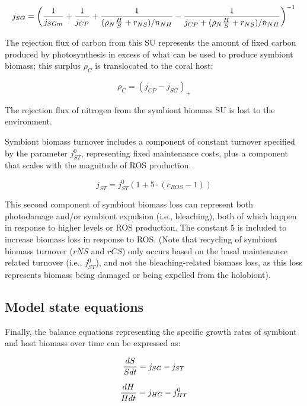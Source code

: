 \documentclass[]{elsarticle} %
\begin{document}
\begin{equation} j_{SG} = \bigg({1 \over j_{SGm}} + {1 \over j_{CP}} + {1 \over {(\rho_N{H \over S} + r_{NS}) / n_{NH}}} - {1 \over {j_{CP} + (\rho_N{H \over S} + r_{NS}) / n_{NH}}}\bigg)^{-1} \end{equation}

The rejection flux of carbon from this SU represents the amount of fixed
carbon produced by photosynthesis in excess of what can be used to
produce symbiont biomass; this surplus \(\rho_C\) is translocated to the
coral host:

\begin{equation} \rho_C = (j_{CP} - j_{SG})_+ \end{equation}

The rejection flux of nitrogen from the symbiont biomass SU is lost to
the environment.

Symbiont biomass turnover includes a component of constant turnover
specified by the parameter \(j_{ST}^0\), representing fixed maintenance
costs, plus a component that scales with the magnitude of ROS
production.

\begin{equation} j_{ST} = j_{ST}^0(1 + 5 \cdot (c_{ROS}-1)) \end{equation}

This second component of symbiont biomass loss can represent both
photodamage and/or symbiont expulsion (i.e., bleaching), both of which
happen in response to higher levels or ROS production. The constant 5 is
included to increase biomass loss in response to ROS. (Note that
recycling of symbiont biomass turnover (\(rNS\) and \(rCS\)) only occurs
based on the basal maintenance related turnover (i.e., \(j_{ST}^0\)),
and not the bleaching-related biomass loss, as this loss represents
biomass being damaged or being expelled from the holobiont).

\subsection{Model state equations}\label{model-state-equations}

Finally, the balance equations representing the specific growth rates of
symbiont and host biomass over time can be expressed as:

\begin{equation} {dS \over Sdt} = j_{SG} - j_{ST} \end{equation}

\begin{equation} {dH \over Hdt} = j_{HG} - j_{HT}^0 \end{equation}
\end{document}

